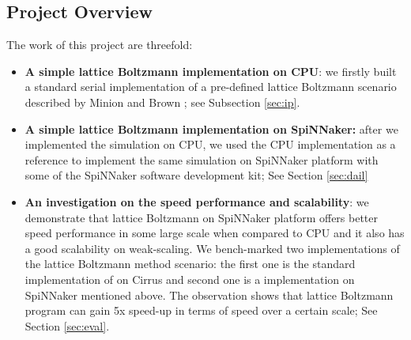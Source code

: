 \subsection{Project Overview}

The work of this project are threefold:\\

\begin{itemize}
\item \textbf{A simple lattice Boltzmann implementation on CPU}: we firstly built a standard serial implementation of a pre-defined lattice Boltzmann scenario described by Minion and Brown \cite{minion1997performance}; see Subsection \ref{sec:ip}. \\

\item \textbf{A simple lattice Boltzmann implementation on SpiNNaker:} after we implemented the simulation on CPU, we used the CPU implementation as a reference to implement the same simulation on SpiNNaker platform with some of the SpiNNaker software development kit; See Section \ref{sec:dail}\\

\item \textbf{An investigation on the speed performance and scalability}: we demonstrate that lattice Boltzmann on SpiNNaker platform offers better speed performance in some large scale when compared to CPU and it also has a good scalability on weak-scaling. We bench-marked two implementations of the lattice Boltzmann method scenario: the first one is the standard implementation of on Cirrus and second one is a implementation on SpiNNaker mentioned above. The observation shows that lattice Boltzmann program can gain 5x speed-up in terms of speed over a certain scale; See Section \ref{sec:eval}.
\end{itemize}


